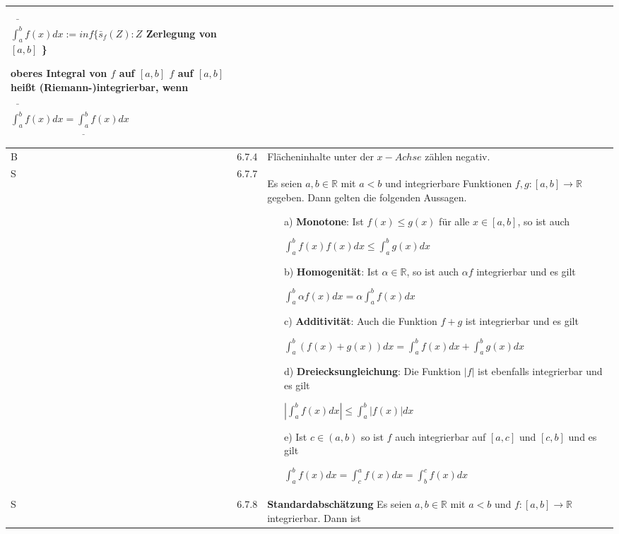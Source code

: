\begin{longtable}{p{0.75cm} p{1cm} p{16cm}}
                        \centerline{$ \bar{\int^b_a}f(x) dx := inf\{ \bar{s}_f (Z): Z$ Zerlegung von $[a,b]$ \} }
                        \textbf{oberes Integral} von $f$ auf $[a,b]$ \hfill \break
                        $f$ auf $[a,b]$ heißt (Riemann-)integrierbar, wenn \hfill \break
                        \centerline{$\bar{\int^b_a}f(x) dx = \underline{\int_a^b} f(x) dx$}\\
        \midrule
        B   & 6.7.4 &   Flächeninhalte unter der $x-Achse$ zählen negativ. \\
        \midrule
        S   & 6.7.7 &   Es seien $a, b \in \mathbb{R}$ mit $a < b$ und integrierbare Funktionen $f,g: [a,b] \rightarrow \mathbb{R}$ gegeben.
                        Dann gelten die folgenden Aussagen.
                        \begin{itemize}[topsep=-0.5cm]
                            \item[a)] \textbf{Monotone}: Ist $f(x) \leq g(x)$ für alle $x \in [a,b]$, so ist auch \hfill \break
                                        \centerline{$ \int_a^b f(x) f(x) dx \leq \int_a^b g(x) dx$}
                            \item[b)] \textbf{Homogenität}: Ist $\alpha \in \mathbb{R}$, so ist auch $\alpha f$ integrierbar und es gilt \hfill \break
                                        \centerline{$ \int_a^b\alpha f(x) dx = \alpha \int_a^bf(x) dx $}
                            \item[c)] \textbf{Additivität}: Auch die Funktion $f+g$ ist integrierbar und es gilt \hfill \break
                                        \centerline{$ \int_a^b (f(x)+g(x))dx= \int_a^bf(x) dx + \int_a^b g(x) dx $}
                            \item[d)] \textbf{Dreiecksungleichung}: Die Funktion $|f|$ ist ebenfalls integrierbar und es gilt \hfill \break
                                        \centerline{$ |\int_a^bf(x)dx| \leq \int_a^b |f(x)| dx $}
                            \item[e)] Ist $c \in (a,b)$ so ist $f$ auch integrierbar auf $[a,c]$ und $[c,b]$ und es gilt \hfill \break
                                        \centerline{$ \int_a^bf(x) dx = \int_c^a f(x) dx = \int_b^c f(x) dx $} 
                        \end{itemize} \vspace{-0cm} \\
        \midrule
        S   & 6.7.8 &   \textbf{Standardabschätzung} \hfill \break
                        Es seien $a,b \in \mathbb{R}$ mit $a < b$ und $f: [a,b] \rightarrow \mathbb{R}$ integrierbar. Dann ist \hfill \break

\end{longtable}

